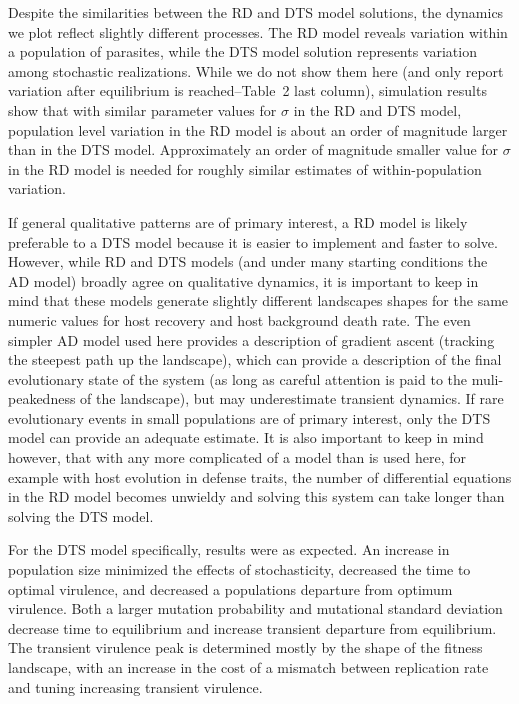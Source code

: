 Despite the similarities between the RD and DTS model solutions, the dynamics we plot reflect slightly different processes. The RD model reveals variation within a population of parasites, while the DTS model solution represents variation among stochastic realizations. While we do not show them here (and only report variation after equilibrium is reached--Table~2 last column), simulation results show that with similar parameter values for $\sigma$ in the RD and DTS model, population level variation in the RD model is about an order of magnitude larger than in the DTS model. Approximately an order of magnitude smaller value for $\sigma$ in the RD model is needed for roughly similar estimates of within-population variation.

If general qualitative patterns are of primary interest, a RD model is likely preferable to a DTS model because it is easier to implement and faster to solve. However, while RD and DTS models (and under many starting conditions the AD model) broadly agree on qualitative dynamics, it is important to keep in mind that these models generate slightly different landscapes shapes for the same numeric values for host recovery and host background death rate. The even simpler AD model used here provides a description of gradient ascent (tracking the steepest path up the landscape), which can provide a description of the final evolutionary state of the system (as long as careful attention is paid to the muli-peakedness of the landscape), but may underestimate transient dynamics. If rare evolutionary events in small populations are of primary interest, only the DTS model can provide an adequate estimate. It is also important to keep in mind however, that with any more complicated of a model than is used here, for example with host evolution in defense traits, the number of differential equations in the RD model becomes unwieldy and solving this system can take longer than solving the DTS model. 

For the DTS model specifically, results were as expected. An increase in population size minimized the effects of stochasticity, decreased the time to optimal virulence, and decreased a populations departure from optimum virulence. Both a larger mutation probability and mutational standard deviation decrease time to equilibrium and increase transient departure from equilibrium. The transient virulence peak is determined mostly by the shape of the fitness landscape, with an increase in the cost of a mismatch between replication rate and tuning increasing transient virulence.

